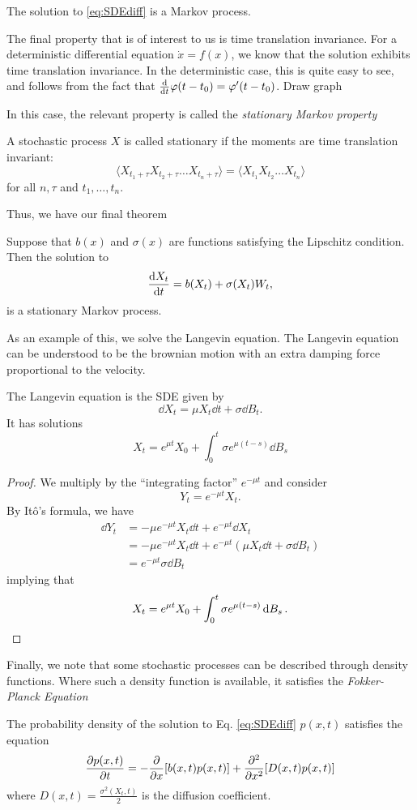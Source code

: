 \documentclass[prb,12pt]{revtex4-2}
\theoremstyle{definition}
\theoremstyle{definition}
\theoremstyle{definition}
\begin{document}
	\begin{Theorem}
		The solution to \eqref{eq:SDEdiff} is a Markov process.
	\end{Theorem}
	
	The final property that is of interest to us is time translation invariance. For a deterministic differential equation $\dot{x} = f(x)$, we know that the solution exhibits time translation invariance. In the deterministic case, this is quite easy to see, and follows from the fact that $\dv{t}\varphi(t - t_0) = \varphi'(t-t_0)$. {\color{red} Draw graph}
	
	In this case, the relevant property is called the \emph{stationary Markov property}
	\begin{Definition}
		A stochastic process $X$ is called stationary if the moments are time translation invariant:
		\[
		\langle X_{t_1+\tau}X_{t_2+\tau}\dots X_{t_n+\tau}\rangle = \langle X_{t_1}X_{t_2}\dots X_{t_n}\rangle
		\]
		for all $n,\tau$ and $t_1, \dots, t_n$.
	\end{Definition}
	
	Thus, we have our final theorem
	\begin{Theorem}
		Suppose that $b(x)$ and $\sigma(x)$ are functions satisfying the Lipschitz condition. Then the solution to
		\begin{equation}\label{eq:SDEdiff2}
			\dv{X_t}{t}=b(X_t)+\sigma(X_t)W_t,
		\end{equation}
		is a stationary Markov process.
	\end{Theorem}
	As an example of this, we solve the Langevin equation. {\color{red} The Langevin equation can be understood to be the brownian motion with an extra damping force proportional to the velocity.}
	\begin{Example}
		The Langevin equation is the SDE given by
		\[\dd{X_t} = \mu X_t \dd{t} + \sigma \dd{B_t}.\]
		It has solutions
		\[X_t = e^{\mu t}X_0 + \int_0^t \sigma e^{\mu(t-s)}\dd{B_s}\]
	\end{Example}
	\begin{proof}
		We multiply by the ``integrating factor'' $e^{-\mu t}$ and consider
		\[Y_t = e^{-\mu t}X_t.\]
		By Itô's formula, we have
		\begin{align*}
			\dd{Y_t} &= -\mu e^{-\mu t}X_t \dd{t} + e^{-\mu t}\dd{X_t}\\
			&=  -\mu e^{-\mu t}X_t \dd{t} + e^{-\mu t}(\mu X_t \dd{t} + \sigma \dd{B_t})\\
			&= e^{-\mu t}\sigma \dd{B_t}
		\end{align*}
		implying that
		\[X_t = e^{\mu t}X_0 + \int_0^t \sigma e^{\mu(t-s)}\dd{B_s}.\qedhere\]
	\end{proof}
	Finally, we note that some stochastic processes can be described through density functions. Where such a density function is available, it satisfies the \emph{Fokker-Planck Equation}
	\begin{Theorem}
		The probability density of the solution to Eq. \eqref{eq:SDEdiff} $p(x,t)$ satisfies the equation
		\[\pdv{p(x,t)}{t}=-\pdv{x}[b(x,t)p(x,t)]+\pdv[2]{x}[D(x,t)p(x,t)]\]
		where $D(x,t) =\frac{\sigma^2(X_t, t)}{2}$ is the diffusion coefficient.
	\end{Theorem}
	
	
	\nocite{kuo2005introduction}
	\nocite{oksendal2010stochastic}
\end{document}
